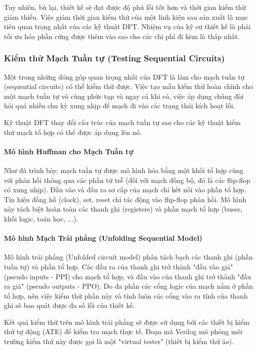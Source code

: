 Tuy nhiên, bù lại, thiết kế sẽ đạt được độ phủ lỗi tốt hơn và thời gian kiểm thử giảm thiểu. Việc giảm thời gian kiểm thử của một linh kiện sau sản xuất là mục tiêu quan trọng nhất của các kỹ thuật DFT. Nhiệm vụ của kỹ sư thiết kế là phải tối ưu hóa phần cứng được thêm vào sao cho các chi phí đi kèm là thấp nhất.

\subsubsection{Kiểm thử Mạch Tuần tự (Testing Sequential Circuits)}
Một trong những đóng góp quan trọng nhất của DFT là làm cho mạch tuần tự (sequential circuits) có thể kiểm thử được. Việc tạo mẫu kiểm thử hoàn chỉnh cho một mạch tuần tự vô cùng phức tạp và ngay cả khi có, việc áp dụng chúng đòi hỏi quá nhiều chu kỳ xung nhịp để mạch đi vào các trạng thái kích hoạt lỗi.

Kỹ thuật DFT thay đổi cấu trúc của mạch tuần tự sao cho các kỹ thuật kiểm thử mạch tổ hợp có thể được áp dụng lên nó.  

\paragraph{Mô hình Huffman cho Mạch Tuần tự}
Như đã trình bày, mạch tuần tự được mô hình hóa bằng một khối tổ hợp cùng với phản hồi thông qua các phần tử trễ (đối với mạch đồng bộ, đó là các flip-flop có xung nhịp). Đầu vào và đầu ra sơ cấp của mạch chỉ kết nối vào phần tổ hợp. Tín hiệu đồng hồ (clock), set, reset chỉ tác động vào flip-flop phản hồi. Mô hình này tách biệt hoàn toàn các thanh ghi (registers) và phần mạch tổ hợp (buses, khối logic, toán học, ...).

\paragraph{Mô hình Mạch Trải phẳng (Unfolding Sequential Model)}
Mô hình trải phẳng (Unfolded circuit model) phân tách bạch các thanh ghi (phần tuần tự) và phần tổ hợp. Các đầu ra của thanh ghi trở thành "đầu vào giả" (pseudo inputs - PPI) cho mạch tổ hợp, và đầu vào của thanh ghi trở thành "đầu ra giả" (pseudo outputs - PPO). Do đa phần các cổng logic của mạch nằm ở phần tổ hợp, nên việc kiểm thử phần này và tính luôn các cổng vào ra tĩnh của thanh ghi sẽ bao quát được đa số lỗi của thiết kế.

Kết quả kiểm thử trên mô hình trải phẳng sẽ được sử dụng bởi các thiết bị kiểm thử tự động (ATE) để kiểm tra mạch thực tế. Đoạn mã Verilog mô phỏng môi trường kiểm thử này được gọi là một "virtual tester" (thiết bị kiểm thử ảo).

